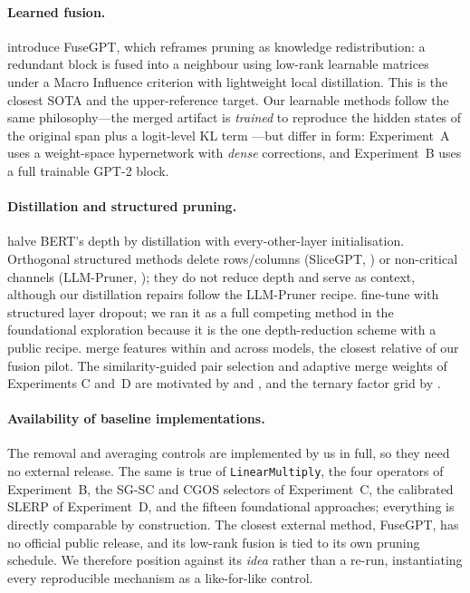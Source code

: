 \documentclass[10pt,a4paper]{article}
\newcommand{\linop}{\texttt{LinearMultiply}}
\begin{document}
\paragraph{Learned fusion.} \citet{pei2024fusegpt} introduce FuseGPT, which
reframes pruning as knowledge redistribution: a redundant block is fused into a
neighbour using low-rank learnable matrices under a Macro Influence criterion
with lightweight local distillation. This is the closest SOTA and the
upper-reference target. Our learnable methods follow the same philosophy---the
merged artifact is \emph{trained} to reproduce the hidden states of the original
span plus a logit-level KL term \citep{hinton2015distilling}---but differ in
form: Experiment~A uses a weight-space hypernetwork with \emph{dense}
corrections, and Experiment~B uses a full trainable GPT-2 block.

\paragraph{Distillation and structured pruning.} \citet{sanh2019distilbert}
halve BERT's depth by distillation with every-other-layer initialisation.
Orthogonal structured methods delete rows/columns (SliceGPT,
\citealt{ashkboos2024slicegpt}) or non-critical channels (LLM-Pruner,
\citealt{ma2023llmpruner}); they do not reduce depth and serve as context,
although our distillation repairs follow the LLM-Pruner recipe.
\citet{fan2020layerdrop} fine-tune with structured layer dropout; we ran it as a
full competing method in the foundational exploration because it is the one
depth-reduction scheme with a public recipe. \citet{stoica2024zipit} merge
features within and across models, the closest relative of our fusion pilot.
The similarity-guided pair selection and adaptive merge weights of Experiments
C and~D are motivated by \citet{zhang2025com} and \citet{liu2024mka}, and the
ternary factor grid by \citet{ma2024bitnet}.

\paragraph{Availability of baseline implementations.} The removal and averaging
controls are implemented by us in full, so they need no external release. The
same is true of \linop{}, the four operators of Experiment~B, the SG-SC and CGOS
selectors of Experiment~C, the calibrated SLERP of Experiment~D, and the fifteen
foundational approaches; everything is directly comparable by construction. The
closest external method, FuseGPT, has no official public release, and its
low-rank fusion is tied to its own pruning schedule. We therefore position
against its \emph{idea} rather than a re-run, instantiating every reproducible
mechanism as a like-for-like control.
\end{document}
